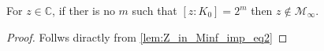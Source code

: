 \begin{corollary}
    \label{cor:not_in_M_inf}
    For $z \in \mathbb{C}$, if ther is no $m$ such that $[z:K_0]=2^m$ then $z\notin \mathcal{M}_{\infty}$.
\end{corollary}

\begin{proof}
    Follws diractly from \ref{lem:Z_in_Minf_imp_eq2}
\end{proof}